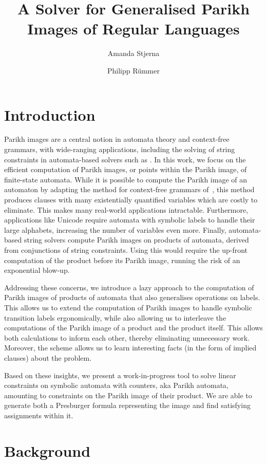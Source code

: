 \documentclass{easychair}
\title{A Solver for Generalised Parikh Images of Regular Languages}
\author{Amanda Stjerna \and Philipp Rümmer}
\institute{Uppsala University, Sweden}
\begin{document}
\maketitle

\section{Introduction}

Parikh images are a central notion in automata theory and context-free grammars,
with wide-ranging applications, including the solving
of string constraints in automata-based solvers such as \Ostrich{}
\cite{ostrich}. In this work, we focus on the efficient computation
of Parikh images, or points within the Parikh image, of finite-state
automata. While it is possible to compute the Parikh image of an automaton
by adapting the method for context-free grammars
 of~\cite{generate-parikh-image}, this method
produces clauses with many existentially quantified variables which are costly
to eliminate. This makes many real-world applications intractable. Furthermore,
applications like Unicode require automata with symbolic labels to handle their
large alphabets, increasing the number of variables even more.
Finally, automata-based string solvers compute Parikh images on products of
automata, derived from conjunctions of string constraints. Using
\cite{generate-parikh-image} this would require the up-front computation of the
product before its Parikh image, running the risk of an exponential blow-up.

Addressing these concerns, we introduce a lazy approach to the computation of
Parikh images of products of automata that also generalises operations on
labels. This allows us to extend the computation of Parikh images to handle
symbolic transition labels ergonomically, while also allowing us to interleave
the computations of the Parikh image of a product and the product itself. This
allows both calculations to inform each other, thereby eliminating unnecessary
work. Moreover, the scheme allows us to learn interesting facts (in the form of
implied clauses) about the problem.

Based on these insights, we present a work-in-progress tool to solve linear
constraints on symbolic automata with counters, aka Parikh automata, amounting
to constraints on the Parikh image of their product. We are able to generate
both a Presburger formula representing the image and find satisfying assignments
within it.

\section{Background}
\end{document}
